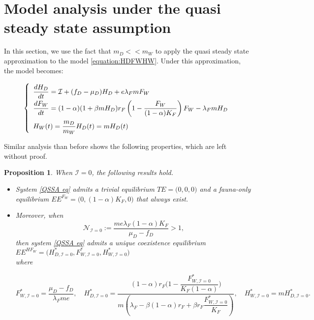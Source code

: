 \documentclass{article}
\newcommand{\lfw}{\lambda_{F}}
\newcommand{\lfw}{\lambda_{F}}
\newcommand{\cI}{\mathcal{I}}
\newtheorem{prop}{Proposition}
\begin{document}
\section{Model analysis under the quasi steady state assumption}
In this section, we use the fact that $m_D <<m_W$ to apply the quasi steady state approximation to the model \eqref{equation:HDFWHW}. Under this approximation, the model becomes:

\begin{equation}
\def\arraystretch{2}
\left\lbrace \begin{array}{l}
\dfrac{dH_D}{dt} = \cI + (f_D - \mu_D) H_D + e \lfw m F_W \\
\dfrac{dF_W}{dt} = (1-\alpha) (1+\beta m H_D) r_F \left(1 - \dfrac{F_W}{(1-\alpha)K_F} \right) F_W - \lfw m H_D \\
H_W(t) = \dfrac{m_D}{m_W} H_D(t) = m H_D(t)
\end{array} \right.
\label{QSSA eq}
\end{equation}

Similar analysis than before shows the following properties, which are left without proof.

\begin{prop}
When $\cI = 0$, the following results hold.
\begin{itemize}
\item System \eqref{QSSA eq} admits a trivial equilibrium $TE = \Big(0,0,0\Big)$ and a fauna-only equilibrium $EE^{F_W} = \Big(0, (1-\alpha)K_F, 0 \Big)$ that always exist.

\item Moreover, when
$$
\mathcal{N}_{\cI = 0} := \dfrac{m e \lfw (1-\alpha)K_F}{\mu_D - f_D} >1,
$$ 
then system \eqref{QSSA eq} admits a unique coexistence equilibrium $EE^{HF_W} = \Big(H^*_{D, \cI = 0}, F^*_{W, \cI = 0}, H^*_{W, \cI = 0} \Big)$ \\ 
where 


$$F^*_{W, \cI = 0} = \dfrac{\mu_D - f_D}{\lfw m e},
\quad 
H^*_{D, \cI = 0} = \dfrac{(1-\alpha)r_F\Big(1 - \dfrac{F^*_{W, \cI = 0}}{K_F(1-\alpha)} \Big)}{m\left(\lfw - \beta (1-\alpha) r_F + \beta r_F  \dfrac{F^*_{W, \cI = 0}}{K_F}\right)} ,
\quad 
H^*_{W, \cI = 0} = m H^*_{D, \cI = 0}.$$
\end{itemize}
\end{prop}
\end{document}
